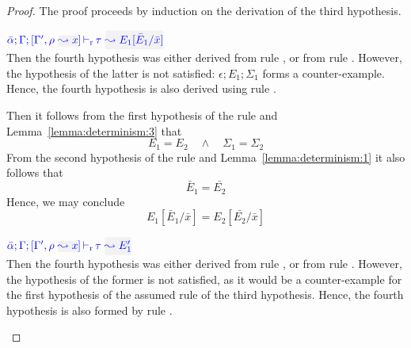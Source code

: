\begin{proof}
The proof proceeds by induction on the derivation of the third hypothesis.
\begin{description}
\setlength{\itemsep}{1em}
\item[\fbox{\rref{L-RuleMatch}}]\quad$\dlres{\bar{\alpha}}{\tenv}{\tenv',\ie{\rulet}{x}}{\type}{E_1[\bar{E}_1/\bar{x}]}$\\

  Then the fourth hypothesis was either derived from rule ,
  or from rule . However, the hypothesis of the latter is
  not satisfied: $\epsilon;E_1;\Sigma_1$ forms a counter-example. Hence, the fourth
  hypothesis is also derived using rule .

  Then it follows from the first hypothesis of the rule and Lemma~\ref{lemma:determinism:3} that
\begin{equation*}
  E_1 = E_2 \quad\wedge\quad \Sigma_1 = \Sigma_2
\end{equation*}
  From the second hypothesis of the rule and Lemma~\ref{lemma:determinism:1} it also follows that
\begin{equation*}
  \bar{E}_1 = \bar{E_2}
\end{equation*}
  Hence, we may conclude
\begin{equation*}
  E_1[\bar{E}_1/\bar{x}] = E_2[\bar{E_2}/\bar{x}]
\end{equation*}


\item[\fbox{\rref{L-RuleNoMatch}}]\quad$\dlres{\bar{\alpha}}{\tenv}{\tenv',\ie{\rulet}{x}}{\type}{E_1'}$\\

  Then the fourth hypothesis was either derived from rule ,
  or from rule . However, the hypothesis of the former is
  not satisfied, as it would be a counter-example for the first hypothesis of
  the assumed rule of the third hypothesis. Hence, the fourth hypothesis is also
  formed by rule .


\end{description}
\end{proof}
